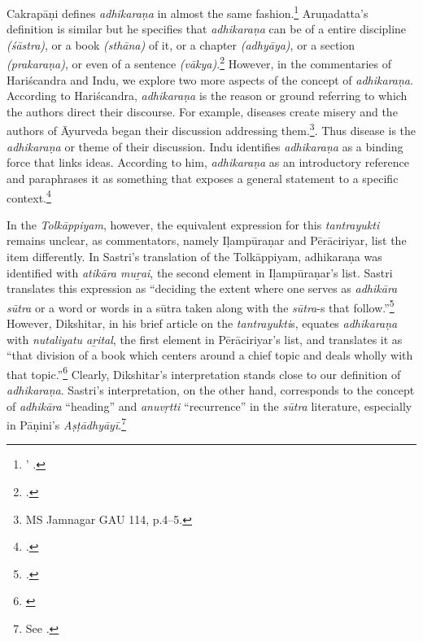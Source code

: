 Cakrapāṇi defines \emph{adhikaraṇa} in almost the same fashion.\footnote{’  \parencite[736]{cara-trikamji3}.}
Aruṇadatta's definition is similar but he specifies that \emph{adhikaraṇa} can be of a entire discipline \emph{(śāstra)}, or a book \emph{(sthāna)} of it, or a chapter \emph{(adhyāya)}, or a section \emph{(prakaraṇa)}, or even of a sentence \emph{(vākya)}.\footnote{ \parencite[947]{kunt-1939}.} 
However, in the commentaries of Hariścandra and Indu, we explore two more aspects of the concept of \emph{adhikaraṇa}. According to Hariścandra, \emph{adhikaraṇa} is the reason or ground referring to which the authors direct their discourse. For example, diseases create misery and the authors of Āyurveda began their discussion addressing them.\footnote{ MS Jamnagar GAU 114, p.4--5.}.
Thus disease is the \emph{adhikaraṇa} or theme of their discussion. Indu identifies \emph{adhikaraṇa} as a binding force that links ideas. According to him, \emph{adhikaraṇa} as an introductory reference and paraphrases it as something that exposes a general statement to a specific context.\footnote{ \parencite[959]{atha-1980}.} 

In the \emph{Tolkāppiyam}, however, the equivalent expression for this \emph{tantrayukti} remains unclear, as commentators, namely Iḷampūraṇar and Pērāciriyar, list the item differently. In Sastri's translation of the Tolkāppiyam, adhikaraṇa was identified with \emph{atikāra muṟai}, the second element in Iḷampūraṇar's list. Sastri translates this expression as “deciding the extent where one serves as \emph{adhikāra sūtra} or a word or words in a sūtra taken along with the \emph{sūtra}-s that follow.”\footnote{\cite[233]{sast-1936}.} However, Dikshitar, in his brief article on the \emph{tantrayukti}s, equates \emph{adhikaraṇa} with \emph{nutaliyatu aṟital}, the first element in Pērāciriyar's list, and translates it as “that division of a book which centers around a chief topic and deals wholly with that topic.”\footnote{\cite[85]{diks-1930}} Clearly, Dikshitar's interpretation stands close to our definition of \emph{adhikaraṇa}. Sastri's interpretation, on the other hand, corresponds to the concept of \emph{adhikāra} “heading” and \emph{anuvṛtti} “recurrence” in the \emph{sūtra} literature, especially in Pāṇini's \emph{Aṣṭādhyāyī}.\footnote{See \cite[111]{chev-2009}.} 

